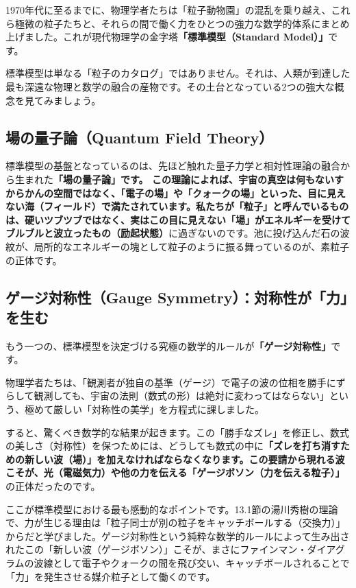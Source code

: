 1970年代に至るまでに、物理学者たちは「粒子動物園」の混乱を乗り越え、これら極微の粒子たちと、それらの間で働く力をひとつの強力な数学的体系にまとめ上げました。これが現代物理学の金字塔\textbf{「標準模型（Standard Model）」}です。

標準模型は単なる「粒子のカタログ」ではありません。それは、人類が到達した最も深遠な物理と数学の融合の産物です。その土台となっている2つの強大な概念を見てみましょう。

\subsection{場の量子論（Quantum Field Theory）}

標準模型の基盤となっているのは、先ほど触れた量子力学と相対性理論の融合から生まれた\textbf{「場の量子論」です。 この理論によれば、宇宙の真空は何もないすからかんの空間ではなく、「電子の場」や「クォークの場」といった、目に見えない海（フィールド）で満たされています。私たちが「粒子」と呼んでいるものは、硬いツブツブではなく、実はこの目に見えない「場」がエネルギーを受けてブルブルと波立ったもの（励起状態）}に過ぎないのです。池に投げ込んだ石の波紋が、局所的なエネルギーの塊として粒子のように振る舞っているのが、素粒子の正体です。

\subsection{ゲージ対称性（Gauge Symmetry）：対称性が「力」を生む}

もう一つの、標準模型を決定づける究極の数学的ルールが\textbf{「ゲージ対称性」}です。

物理学者たちは、「観測者が独自の基準（ゲージ）で電子の波の位相を勝手にずらして観測しても、宇宙の法則（数式の形）は絶対に変わってはならない」という、極めて厳しい「対称性の美学」を方程式に課しました。

すると、驚くべき数学的な結果が起きます。この「勝手なズレ」を修正し、数式の美しさ（対称性）を保つためには、どうしても数式の中に\textbf{「ズレを打ち消すための新しい波（場）」を加えなければならなくなります。この要請から現れる波こそが、光（電磁気力）や他の力を伝える「ゲージボソン（力を伝える粒子）」}の正体だったのです。

ここが標準模型における最も感動的なポイントです。13.1節の湯川秀樹の理論で、力が生じる理由は「粒子同士が別の粒子をキャッチボールする（交換力）」からだと学びました。ゲージ対称性という純粋な数学的ルールによって生み出されたこの「新しい波（ゲージボソン）」こそが、まさにファインマン・ダイアグラムの波線として電子やクォークの間を飛び交い、キャッチボールされることで「力」を発生させる媒介粒子として働くのです。

